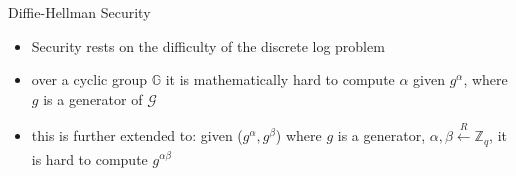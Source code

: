 \documentclass[]{beamer}
\begin{document}
\begin{frame}{Diffie-Hellman Security}
    \begin{itemize}
        \item \pause Security rests on the difficulty of the discrete log problem
        \item \pause over a cyclic group \(\mathbb{G}\) it is mathematically hard to compute \(\alpha\) given \(g^\alpha\), where \(g\) is a generator of \(\mathcal{G}\)
        \item \pause this is further extended to: given (\(g^\alpha, g^\beta\)) where \(g\) is a generator, \(\alpha, \beta \xleftarrow[]{R} \mathbb{Z}_q\), it is hard to compute \(g^{\alpha\beta}\)
    \end{itemize}
\end{frame}
\end{document}
